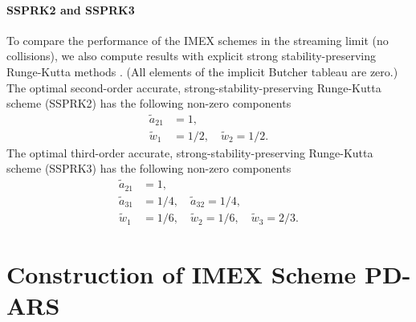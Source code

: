 \paragraph{SSPRK2 and SSPRK3}

To compare the performance of the IMEX schemes in the streaming limit (no collisions), we also compute results with explicit strong stability-preserving Runge-Kutta methods \cite{gottlieb_etal_2001}.  
(All elements of the implicit Butcher tableau are zero.)  
The optimal second-order accurate, strong-stability-preserving Runge-Kutta scheme (SSPRK2) has the following non-zero components
\begin{align}
  \tilde{a}_{21} &= 1, \nonumber \\ 
  \tilde{w}_{1}  &= 1/2, \quad \tilde{w}_{2} = 1/2. \nonumber 
\end{align}
The optimal third-order accurate, strong-stability-preserving Runge-Kutta scheme (SSPRK3) has the following non-zero components
\begin{align}
  \tilde{a}_{21} &= 1, \nonumber \\
  \tilde{a}_{31} &= 1/4, \quad \tilde{a}_{32} = 1/4, \nonumber \\
  \tilde{w}_{1} &= 1/6, \quad \tilde{w}_{2} = 1/6, \quad \tilde{w}_{3} =2/3. \nonumber
\end{align}

\section{Construction of IMEX Scheme PD-ARS}
\label{app:PD-ARS}

